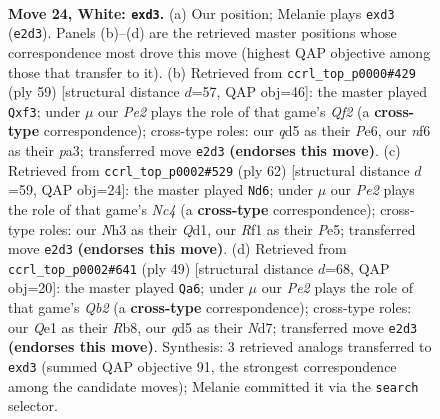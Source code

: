 \documentclass[11pt]{article}
\begin{document}
\clearpage

\begin{figure}[p]\centering
\begin{subfigure}{0.46\textwidth}\centering
\resizebox{\linewidth}{!}{%
\newchessgame
\chessboard[
  setfen={1n3Bk1/5p2/5np1/3q3p/3p3P/3p2PN/4PP2/rN2QRK1 w - - 0 24},
  showmover=false,
  pgfstyle=straightmove, color=movearrow, markmove={e2-d3}
]}
\caption{}
\end{subfigure}\hfill
\begin{subfigure}{0.46\textwidth}\centering
\resizebox{\linewidth}{!}{%
\newchessgame
\chessboard[
  setfen={5rk1/2Rn1qp1/4p2p/3p4/p6P/P2P1NP1/1P2QP2/6K1 b - - 2 30},
  showmover=false,
  pgfstyle=straightmove, color=movearrow, markmove={f7-f3}
]}
\caption{}
\end{subfigure}
\\[4pt]
\begin{subfigure}{0.46\textwidth}\centering
\resizebox{\linewidth}{!}{%
\newchessgame
\chessboard[
  setfen={2r3k1/p3q1p1/1p2p2p/3nPp2/2NR4/1P4P1/P4P1P/3Q2K1 w - - 2 32},
  showmover=false,
  pgfstyle=straightmove, color=movearrow, markmove={c4-d6}
]}
\caption{}
\end{subfigure}\hfill
\begin{subfigure}{0.46\textwidth}\centering
\resizebox{\linewidth}{!}{%
\newchessgame
\chessboard[
  setfen={1r4k1/1q1n1ppp/4p3/6P1/1p1P4/1Q2PN2/5PP1/2R3K1 b - - 1 25},
  showmover=false,
  pgfstyle=straightmove, color=movearrow, markmove={b7-a6}
]}
\caption{}
\end{subfigure}
\caption{\textbf{Move 24, White: \texttt{exd3}.} (a) Our position; Melanie plays \texttt{exd3} (\texttt{e2d3}). Panels (b)--(d) are the retrieved master positions whose correspondence most drove this move (highest QAP objective among those that transfer to it). (b) Retrieved from \texttt{ccrl\_top\_p0000\#429} (ply 59) [structural distance $d$=57, QAP obj=46]: the master played \texttt{Qxf3}; under $\mu$ our \emph{Pe2} plays the role of that game's \emph{Qf2} (a \textbf{cross-type} correspondence); cross-type roles: our \emph{q}d5 as their \emph{P}e6, our \emph{n}f6 as their \emph{p}a3; transferred move \texttt{e2d3} \textbf{(endorses this move)}. (c) Retrieved from \texttt{ccrl\_top\_p0002\#529} (ply 62) [structural distance $d$=59, QAP obj=24]: the master played \texttt{Nd6}; under $\mu$ our \emph{Pe2} plays the role of that game's \emph{Nc4} (a \textbf{cross-type} correspondence); cross-type roles: our \emph{N}h3 as their \emph{Q}d1, our \emph{R}f1 as their \emph{P}e5; transferred move \texttt{e2d3} \textbf{(endorses this move)}. (d) Retrieved from \texttt{ccrl\_top\_p0002\#641} (ply 49) [structural distance $d$=68, QAP obj=20]: the master played \texttt{Qa6}; under $\mu$ our \emph{Pe2} plays the role of that game's \emph{Qb2} (a \textbf{cross-type} correspondence); cross-type roles: our \emph{Q}e1 as their \emph{R}b8, our \emph{q}d5 as their \emph{N}d7; transferred move \texttt{e2d3} \textbf{(endorses this move)}. Synthesis: 3 retrieved analogs transferred to \texttt{exd3} (summed QAP objective 91, the strongest correspondence among the candidate moves); Melanie committed it via the \texttt{search} selector.}
\label{fig:thought-m46}
\end{figure}
\end{document}
